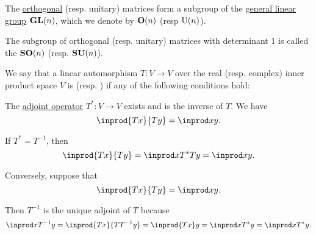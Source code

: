 \begin{definition}\label{def:unitary_groups}\mimprovised
  The \hyperref[def:unitary_matrix]{orthogonal} (resp. unitary) matrices form a subgroup of the \hyperref[def:linear_groups]{general linear group} \( \grp{GL}(n) \), which we denote by \( \grp{O}(n) \) (resp \( \op{U}(n) \)).

  The subgroup of orthogonal (resp. unitary) matrices with determinant \( 1 \) is called the  \( \grp{SO}(n) \) (resp. \( \grp{SU}(n) \)).
\end{definition}

\begin{definition}\label{def:unitary_operator}\mimprovised
  We say that a linear automorphism \( T: V \to V \) over the real (resp. complex) inner product space \( V \) is  (resp. ) if any of the following conditions hold:
  \begin{thmenum}
     The \hyperref[def:adjoint_operator]{adjoint operator} \( T^*: V \to V \) exists and is the inverse of \( T \).
     We have
    \begin{equation*}
      \inprod {Tx} {Ty} = \inprod x y.
    \end{equation*}
  \end{thmenum}
\end{definition}
\begin{defproof}
   If \( T^* = T^{-1} \), then
  \begin{equation*}
    \inprod {Tx} {Ty} = \inprod x {T^* T y} = \inprod x y.
  \end{equation*}

   Conversely, suppose that
  \begin{equation*}
    \inprod {Tx} {Ty} = \inprod x y.
  \end{equation*}

  Then \( T^{-1} \) is the unique adjoint of \( T \) because
  \begin{equation*}
    \inprod x {T^{-1}y}
    =
    \inprod {Tx} {TT^{-1}y}
    =
    \inprod {Tx} y
    =
    \inprod x {T^* y}
    =
    \inprod x {T^* y}.
  \end{equation*}
\end{defproof}

